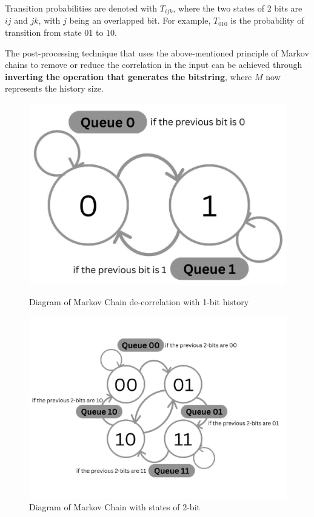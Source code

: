 Transition probabilities are denoted with \( T_{ijk} \), where the two states of 2 bits are \( ij \) and \( jk \), with \( j \) being an overlapped bit. For example, \( T_{010} \) is the probability of transition from state \( 01 \) to \( 10 \).

The post-processing technique that uses the above-mentioned principle of Markov chains to remove or reduce the correlation in the input can be achieved through \textbf{inverting the operation that generates the bitstring}, where \( M \) now represents the history size.

\begin{figure}[h]
    \centering
    \begin{minipage}{0.45\textwidth}
        \centering
        \includegraphics[width=\textwidth]{figures/mkv1 model.pdf}
        \caption{Diagram of Markov Chain de-correlation with 1-bit history}
        \label{fig:MKV22}
    \end{minipage}
    \hfill
    \centering
    \begin{minipage}{0.45\textwidth}
        \centering
        \includegraphics[width=\textwidth]{figures/MKV2_MODEL.pdf}
        \caption{Diagram of Markov Chain with states of 2-bit}
        \label{fig:MKV2mod}
    \end{minipage}
    
\end{figure}

